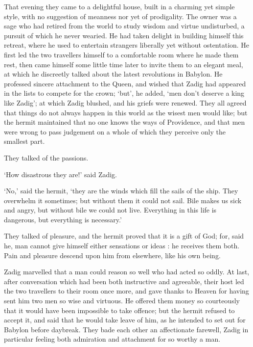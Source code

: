 \documentclass{article}
\begin{document}
\begin{center}
That evening they came to a delightful house, built in a charming yet simple style, 
with no suggestion of meanness nor yet of prodigality. The owner was a sage who 
had retired from the world to study wisdom and virtue undisturbed, a pursuit of 
which he never wearied. He had taken delight in building himself this retreat, 
where he used to entertain strangers liberally yet without ostentation. He first 
led the two travellers himself to a comfortable room where he made them rest, then 
came himself some little time later to invite them to an elegant meal, at which 
he discreetly talked about the latest revolutions in Babylon. He professed sincere 
attachment to the Queen, and wished that Zadig had appeared in the lists to compete 
for the crown; `but', he added, `men don't deserve a king like Zadig'; at which 
Zadig blushed, and his griefs were renewed. They all agreed that things do not 
always happen in this world as the wisest men would like; but the hermit maintained 
that no one knows the ways of Providence, and that men were wrong to pass judgement 
on a whole of which they perceive only the smallest part. 

They talked of the passions. 

`How disastrous they are!' said Zadig. 

`No,' said the hermit, `they are the winds which fill the sails of the ship. They 
overwhelm it sometimes; but without them it could not sail. Bile makes us sick 
and angry, but without bile we could not live. Everything in this life is dangerous, 
but everything is necessary.' 

They talked of pleasure, and the hermit proved that it is a gift of God; for, said 
he, man cannot give himself either sensations or ideas : he receives them both. 
Pain and pleasure descend upon him from elsewhere, like his own being. 

Zadig marvelled that a man could reason so well who had acted so oddly. At last, 
after conversation which had been both instructive and agreeable, their host led 
the two travellers to their room once more, and gave thanks to Heaven for having 
sent him two men so wise and virtuous. He offered them money so courteously that 
it would have been impossible to take offence; but the hermit refused to accept 
it, and said that he would take leave of him, as he intended to set out for Babylon 
before daybreak. They bade each other an affectionate farewell, Zadig in particular 
feeling both admiration and attachment for so worthy a man. 


\end{center}
\end{document}
